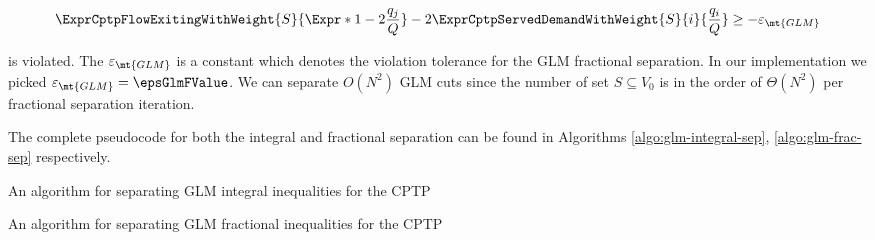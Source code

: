 \begin{equation}
	\begin{split}
		\ExprCptpFlowExitingWithWeight{S}{\Expr*{1 - 2 \frac{q_j}{Q}}} - 2 	\ExprCptpServedDemandWithWeight{S}{i}{\frac{q_i}{Q}} \ge - \varepsilon_{\mt{GLM}}
	\end{split}
\end{equation}

is violated.
The $\varepsilon_{\mt{GLM}}$ is a constant which denotes the violation tolerance for the GLM fractional separation.
In our implementation we picked $\varepsilon_{\mt{GLM}} = \epsGlmFValue$.
We can separate $O(N^2)$ GLM cuts since the number of set $S \subseteq V_0$ is in the order of $\Theta(N^2)$ per fractional separation iteration.

The complete pseudocode for both the integral and fractional separation can be found in Algorithms \ref{algo:glm-integral-sep}, \ref{algo:glm-frac-sep} respectively.

\begin{algorithm}
	\caption{An algorithm for separating GLM integral inequalities for the CPTP}
	\label{algo:glm-integral-sep}
	
\end{algorithm}

\begin{algorithm}
	\caption{An algorithm for separating GLM fractional inequalities for the CPTP}
	\label{algo:glm-frac-sep}
	
\end{algorithm}
